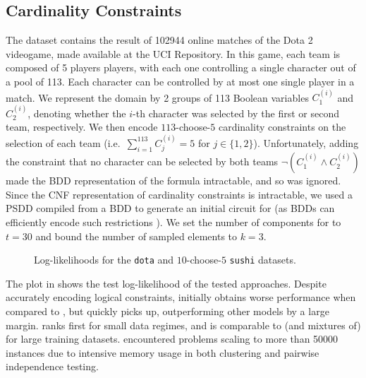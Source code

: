 \subsection{Cardinality Constraints}

The  dataset contains the result of \num{102944} online matches of the Dota 2
videogame, made available at the UCI Repository. In this game, each team is composed of 5 players
players, with each one controlling a single character out of a pool of 113. Each character can be
controlled by at most one single player in a match. We represent the domain by 2 groups of 113
Boolean variables $C_1^{(i)}$ and $C_2^{(i)}$, denoting whether the $i$-th character was selected
by the first or second team, respectively. We then encode $113$-choose-$5$ cardinality constraints
on the selection of each team (i.e.\ $\sum_{i=1}^113 C_j^{(i)}=5$ for $j\in\{1,2\}$).
Unfortunately, adding the constraint that no character can be selected by both teams
$\neg(C_1^{(i)}\wedge C_2^{(i)})$ made the BDD representation of the formula intractable, and so
was ignored. Since the CNF representation of cardinality constraints is intractable, we used a PSDD
compiled from a BDD to generate an initial circuit for  (as BDDs can
efficiently encode such restrictions \citep{een06}). We set the number of components for
 to $t=30$ and bound the number of sampled elements to $k=3$.

\begin{figure}[t]
  \begin{subfigure}{0.495\textwidth}
    \caption{}
    \label{fig:ll-dota}
  \end{subfigure}
  \begin{subfigure}{0.495\textwidth}
    \caption{}
    \label{fig:ll-sushi-choose}
  \end{subfigure}
  \caption{Log-likelihoods for the \texttt{dota}  and $10$-choose-$5$ \texttt{sushi}
     datasets.}
  \label{fig:ll-cardinality}
\end{figure}

The plot in  shows the test log-likelihood of the tested approaches. Despite
accurately encoding logical constraints,  initially obtains worse performance
when compared to , but quickly picks up, outperforming other models by a
large margin.  ranks first for small data regimes, and is comparable to
 (and mixtures of) for large training datasets.  encountered
problems scaling to more than \num{50000} instances due to intensive memory usage in both
clustering and pairwise independence testing.

